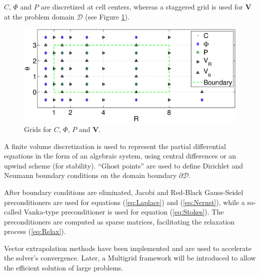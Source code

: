 \documentclass[12pt]{article}
\newcommand{\cl}[1]{\ensuremath{\mathcal{#1}}}
\providecommand\bV{\boldsymbol{V}}
\begin{document}
$C$, $\varPhi$ and $P$ are discretized at cell centers, whereas a
staggered grid is used for $\bV$ at the problem domain $\cl{D}$
(see Figure \ref{fig:Grids}).
\begin{figure}[htbp]
\begin{framed}
    \begin{center}
        \includegraphics[width=1\textwidth]
            {StaggeredGrid.eps}
        \caption{Grids for $C$, $\varPhi$, $P$ and $\bV$.}
        \label{fig:Grids}
    \end{center}
\end{framed}
\end{figure}
A finite volume discretization is used to represent the partial
differential equations in the form of an algebraic system, using
central differences or an upwind scheme (for stability). ``Ghost
points'' are used to define Dirichlet and Neumann boundary
conditions on the domain boundary $\partial \cl{D}$.

After boundary conditions are eliminated, Jacobi and Red-Black
Gauss-Seidel preconditioners are used for equations
(\ref{eq:Laplace}) and (\ref{eq:Nernst}), while a so-called
Vanka-type \cite{vanka1986block} preconditioner is used for equation
(\ref{eq:Stokes}). The preconditioners are computed as sparse
matrices, facilitating the relaxation process (\ref{eq:Relax}).

Vector extrapolation methods \cite{sidi1991efficient} have been 
implemented and are used to accelerate the solver's convergence. 
Later, a Multigrid framework \cite{brandt1977multi, yavneh2006multigrid} 
will be introduced to allow the efficient solution of large problems.



\end{document}
